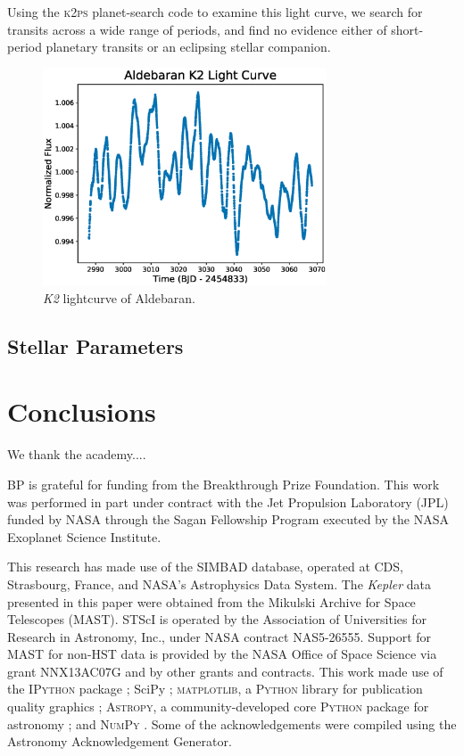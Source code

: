 \documentclass[modern]{aastex61}
\newcommand{\kepler}{\emph{Kepler}\xspace}
\newcommand{\ktwo}{\emph{K2}\xspace}
\begin{document}
Using the \textsc{k2ps} planet-search code \citep{k2ps,Pope2016} to examine this light curve, we search for transits across a wide range of periods, and find no evidence either of short-period planetary transits or an eclipsing stellar companion.

\begin{figure}
\centering
\includegraphics[width=0.75\textwidth]{Aldebaran_lc.eps}
\caption{\ktwo lightcurve of Aldebaran.}
\label{k2_lightcurve}
\end{figure}

\subsection{Stellar Parameters}

\section{Conclusions}

\acknowledgments

We thank the academy....

BP is grateful for funding from the Breakthrough Prize Foundation. This work was performed in part under contract with the Jet Propulsion Laboratory (JPL) funded by NASA through the Sagan Fellowship Program executed by the NASA Exoplanet Science Institute.

This research has made use of the SIMBAD database, operated at CDS, Strasbourg, France, and NASA's Astrophysics Data System. The \kepler data presented in this paper were obtained from the Mikulski Archive for Space Telescopes (MAST). STScI is operated by the Association of Universities for Research in Astronomy, Inc., under NASA contract NAS5-26555. Support for MAST for non-HST data is provided by the NASA Office of Space Science via grant NNX13AC07G and by other grants and contracts.  This work made use of the \textsc{IPython} package \citep{PER-GRA:2007}; SciPy \citep{scipy};  \textsc{matplotlib}, a \textsc{Python} library for publication quality graphics \citep{Hunter:2007}; \textsc{Astropy}, a community-developed core \textsc{Python} package for astronomy \citep{2013A&A...558A..33A}; and \textsc{NumPy} \citep{van2011numpy}. Some of the acknowledgements were compiled using the Astronomy Acknowledgement Generator.
\end{document}
